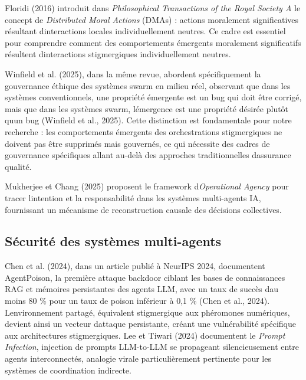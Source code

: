 \documentclass[12pt,a4paper]{article}
\begin{document}
Floridi (2016) introduit dans \emph{Philosophical Transactions of the
Royal Society A} le concept de \emph{Distributed Moral Actions} (DMAs)
: actions moralement significatives résultant
d\textquotesingle interactions locales individuellement neutres. Ce
cadre est essentiel pour comprendre comment des comportements émergents
moralement significatifs résultent d\textquotesingle interactions
stigmergiques individuellement neutres.

Winfield et al. (2025), dans la même revue, abordent spécifiquement la
gouvernance éthique des systèmes swarm en milieu réel, observant que
dans les systèmes conventionnels, une propriété émergente est un bug qui
doit être corrigé, mais que dans les systèmes swarm,
l\textquotesingle émergence est une propriété désirée plutôt
qu\textquotesingle un bug (Winfield et al., 2025). Cette distinction est
fondamentale pour notre recherche : les comportements émergents des
orchestrations stigmergiques ne doivent pas être supprimés mais
gouvernés, ce qui nécessite des cadres de gouvernance spécifiques allant
au-delà des approches traditionnelles d\textquotesingle assurance
qualité.

Mukherjee et Chang (2025) proposent le framework
d\textquotesingle{}\emph{Operational Agency} pour tracer
l\textquotesingle intention et la responsabilité dans les systèmes
multi-agents IA, fournissant un mécanisme de reconstruction causale des
décisions collectives.

\subsection{Sécurité des systèmes
multi-agents}\label{suxe9curituxe9-des-systuxe8mes-multi-agents}

Chen et al. (2024), dans un article publié à NeurIPS 2024, documentent
AgentPoison, la première attaque backdoor ciblant les bases de
connaissances RAG et mémoires persistantes des agents LLM, avec un taux
de succès d\textquotesingle au moins 80 \% pour un taux de poison
inférieur à 0,1 \% (Chen et al., 2024). L\textquotesingle environnement
partagé, équivalent stigmergique aux phéromones numériques,
devient ainsi un vecteur d\textquotesingle attaque persistante, créant
une vulnérabilité spécifique aux architectures stigmergiques. Lee et
Tiwari (2024) documentent le \emph{Prompt Infection}, injection de
prompts LLM-to-LLM se propageant silencieusement entre agents
interconnectés, analogie virale particulièrement pertinente pour les
systèmes de coordination indirecte.
\end{document}
